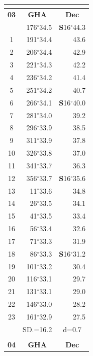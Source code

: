 \documentclass[10pt, a4paper]{report}
\begin{document}
\begin{scriptsize}
\begin{tabular*}{0.2\textwidth}[t]{@{\extracolsep{\fill}}|c|rr|}
\hline
\multicolumn{1}{c}{}\\[-0.5ex]\hline
\multicolumn{1}{|c|}{\rule{0pt}{2.6ex}\textbf{03}} & \multicolumn{1}{c}{\textbf{GHA}} & \multicolumn{1}{c|}{\textbf{Dec}}\\
\hline\rule{0pt}{2.6ex}\noindent
0 & 176$^\circ$34.5 & \textbf{S}16$^\circ$44.3\\
1 & 191$^\circ$34.4 & 43.6\\
2 & 206$^\circ$34.4 & 42.9\\
3 & 221$^\circ$34.3 & \raisebox{0.24ex}{\boldmath$\cdot$~\boldmath$\cdot$~~}42.2\\
4 & 236$^\circ$34.2 & 41.4\\
5 & 251$^\circ$34.2 & 40.7\\[2Pt]
6 & 266$^\circ$34.1 & \textbf{S}16$^\circ$40.0\\
7 & 281$^\circ$34.0 & 39.2\\
8 & 296$^\circ$33.9 & 38.5\\
9 & 311$^\circ$33.9 & \raisebox{0.24ex}{\boldmath$\cdot$~\boldmath$\cdot$~~}37.8\\
10 & 326$^\circ$33.8 & 37.0\\
11 & 341$^\circ$33.7 & 36.3\\[2Pt]
12 & 356$^\circ$33.7 & \textbf{S}16$^\circ$35.6\\
13 & 11$^\circ$33.6 & 34.8\\
14 & 26$^\circ$33.5 & 34.1\\
15 & 41$^\circ$33.5 & \raisebox{0.24ex}{\boldmath$\cdot$~\boldmath$\cdot$~~}33.4\\
16 & 56$^\circ$33.4 & 32.6\\
17 & 71$^\circ$33.3 & 31.9\\[2Pt]
18 & 86$^\circ$33.3 & \textbf{S}16$^\circ$31.2\\
19 & 101$^\circ$33.2 & 30.4\\
20 & 116$^\circ$33.1 & 29.7\\
21 & 131$^\circ$33.1 & \raisebox{0.24ex}{\boldmath$\cdot$~\boldmath$\cdot$~~}29.0\\
22 & 146$^\circ$33.0 & 28.2\\
23 & 161$^\circ$32.9 & 27.5\\
\hline
\rule{0pt}{2.4ex} & \multicolumn{1}{c}{SD.=16.2} & \multicolumn{1}{c|}{d=0.7}\\
\hline
\multicolumn{1}{c}{}\\[-0.5ex]\hline
\multicolumn{1}{|c|}{\rule{0pt}{2.6ex}\textbf{04}} & \multicolumn{1}{c}{\textbf{GHA}} & \multicolumn{1}{c|}{\textbf{Dec}}\\

\end{tabular*}
\end{scriptsize}
\end{document}
